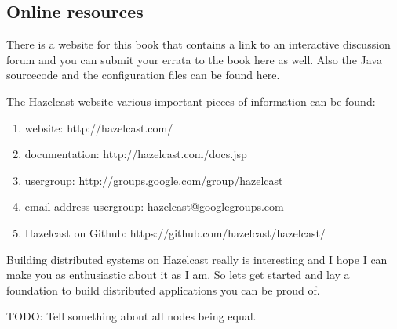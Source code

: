 \subsection*{Online resources}

There is a website for this book that contains a link to an interactive discussion forum and you can submit your errata to the book here as well. Also the Java sourcecode and the configuration files can be found here. 

The Hazelcast website various important pieces of information can be found:
\begin{enumerate}
\item website: http://hazelcast.com/
\item documentation: http://hazelcast.com/docs.jsp
\item usergroup: http://groups.google.com/group/hazelcast
\item email address usergroup: hazelcast@googlegroups.com
\item Hazelcast on Github: https://github.com/hazelcast/hazelcast/
\end{enumerate}

Building distributed systems on Hazelcast really is interesting and I hope I can make you as enthusiastic about it as I am. So lets get started and lay a foundation to build distributed applications you can be proud of.

TODO: Tell something about all nodes being equal.

